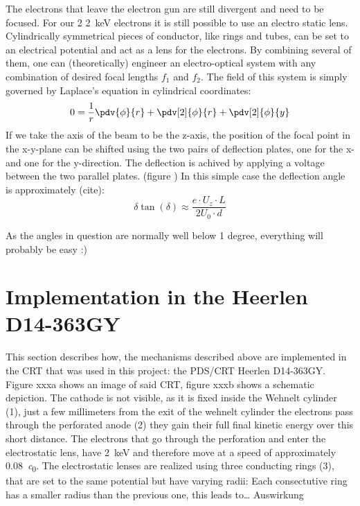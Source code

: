 The electrons that leave the electron gun are still divergent and need to be focused. For our 2 \SI{2}{\kilo\electronvolt} electrons it is still possible to use an electro static lens. Cylindrically symmetrical pieces of conductor, like rings and tubes, can be set to an electrical potential and act as a lens for the electrons. By combining several of them, one can (theoretically) engineer an electro-optical system with any combination of desired focal lengths $f_1$ and $f_2$. The field of this system is simply governed by Laplace's equation in cylindrical coordinates:
\begin{equation}
	0=\dfrac{1}{r}\pdv{\phi}{r}+\pdv[2]{\phi}{r}+\pdv[2]{\phi}{y}
\end{equation}
If we take the axis of the beam to be the z-axis, the position of the focal point in the x-y-plane can be shifted using the two pairs of deflection plates, one for the x- and one for the y-direction. The deflection is achived by applying a voltage between the two parallel plates. (figure ) In this simple case the deflection angle is approximately (cite):
\begin{equation}\label{key}
\delta \tan(\delta) \approx \frac{e \cdot U_z\cdot L}{2 U_0 \cdot d}
\end{equation}

As the angles in question are normally well below 1 degree, everything will probably be easy :) 

\section{Implementation in the Heerlen D14-363GY }

This section describes how, the mechanisms described above are implemented in the CRT that was used in this project: the PDS/CRT Heerlen D14-363GY. Figure xxxa  shows an image of said CRT, figure xxxb  shows a schematic depiction. The cathode is not visible, as it is fixed inside the Wehnelt cylinder (1), just a few millimeters from the exit of the wehnelt cylinder the electrons pass through the perforated anode (2) they gain their full final kinetic energy over this short distance. The electrons that go through the perforation and enter the electrostatic lens, have \SI{2}{\kilo\electronvolt} and therefore move at a speed of approximately \SI{0.08}{\clight}. 
The electrostatic lenses are realized using three conducting rings (3), that are set to the same potential but have varying radii: Each consectutive ring has a smaller radius than the previous one, this leads to…  
 Auswirkung 

